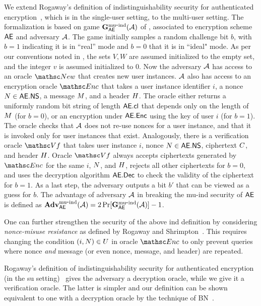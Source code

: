 We extend Rogaway's definition of  indistinguishability security for authenticated encryption~\cite{CCS:Rogaway02}, which is in the single-user setting, to the multi-user setting. The formalization is based on game $\mathbf{G}^{\rm mu\mbox{-}ind}_{\mathsf{AE}}({\cal A})$ of , associated to encryption scheme $\mathsf{AE}$ and adversary ${\cal A}$. The game initially samples a random challenge bit $b$, with $b=1$ indicating it is in ``real'' mode and $b=0$ that it is in ``ideal" mode. As per our conventions noted in ,  the sets $V,W$ are assumed initialized to the empty set, and the integer $v$ is assumed initialized to $0$. Now the adversary ${\cal A}$ has access to an oracle $\NewO$ that creates new user instances. ${\cal A}$ also has access to an encryption oracle $\EncO$ that takes a user instance identifier $i$, a nonce $N \in \mathsf{AE}.\mathsf{NS}$, a message $M$, and a header $H$. The oracle either returns a uniformly random bit string of length $\mathsf{AE}.\mathsf{cl}$ that depends only on the length of $M$ (for $b=0$), or an encryption under $\mathsf{AE}.\mathsf{Enc}$ using the key of user $i$  (for $b=1$). The oracle checks that ${\cal A}$ does not re-use nonces for a user instance, and that it is invoked only for user instances that exist. Analogously, there is a verification oracle $\VfO$ that takes user instance $i$, nonce $N \in \mathsf{AE}.\mathsf{NS}$, ciphertext $C$, and header $H$. Oracle $\VfO$ always accepts ciphertexts generated by $\EncO$ for the same  $i$, $N$, and $H$, rejects all other ciphertexts for $b=0$, and uses the decryption algorithm $\mathsf{AE}.\mathsf{Dec}$ to check the validity of the ciphertext for $b=1$.  As a last step, the adversary outputs a bit $b'$ that can be viewed as a guess for $b$.  The advantage of adversary ${\cal A}$ in breaking the mu-ind security of   $\mathsf{AE}$ is defined as $\mathbf{Adv}^{\rm mu\mbox{-}ind}_{\mathsf{AE}}({\cal A}) = 2\Pr[\mathbf{G}^{\rm mu\mbox{-}ind}_{\mathsf{AE}}({\cal A})]- 1$.





One can further strengthen the security of the above ind definition by considering \emph{nonce-misuse resistance} as defined by Rogaway and Shrimpton~\cite{EC:RogShr06}. This requires changing the condition $(i,N)\in U$ in oracle $\EncO$ to only prevent queries where nonce \emph{and} message (or even nonce, message, and header) are repeated. 

Rogaway's definition of indistinguishability security for authenticated encryption (in the su setting)~\cite{CCS:Rogaway02} gives the adversary a decryption oracle, while we give it a verification oracle. The latter is simpler and our definition can be shown equivalent to one with a decryption oracle by the technique of BN~\cite{AC:BelNam00}.

